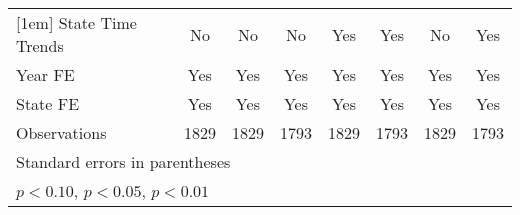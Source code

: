 {\begin{tabular}{l*{7}{c}}
[1em]
State Time Trends   &          No         &          No         &          No         &         Yes         &         Yes         &          No         &         Yes         \\
[1em]
Year FE             &         Yes         &         Yes         &         Yes         &         Yes         &         Yes         &         Yes         &         Yes         \\
[1em]
State FE            &         Yes         &         Yes         &         Yes         &         Yes         &         Yes         &         Yes         &         Yes         \\
\hline
Observations        &        1829         &        1829         &        1793         &        1829         &        1793         &        1829         &        1793         \\
\hline\hline
\multicolumn{8}{l}{\footnotesize Standard errors in parentheses}\\
\multicolumn{8}{l}{\footnotesize \sym{*} \(p<0.10\), \sym{**} \(p<0.05\), \sym{***} \(p<0.01\)}\\
\end{tabular}
}

